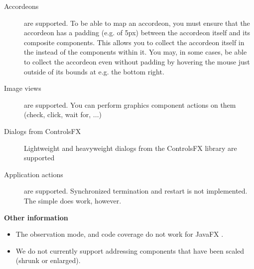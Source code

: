 \begin{description}
\item [Accordeons]{are supported. To be able to map an accordeon, you must ensure that the accordeon has a padding (e.g. of 5px) between the accordeon itself and its composite components. This allows you to collect the accordeon itself in the \gdomm{} instead of the components within it. You may, in some cases, be able to collect the accordeon even without padding by hovering the mouse just outside of its bounds at e.g. the bottom right.}
\item [Image views]{are supported. You can perform graphics component actions on them (check, click, wait for, ...)}
\item [Dialogs from ControlsFX]{Lightweight and heavyweight dialogs from the ControlsFX library are supported}
\item [Application actions]{are supported. Synchronized termination and restart is not implemented. The simple  does work, however.}
\end{description}

\textbf{Other information}
\begin{itemize}
\item The observation mode,  and code coverage do not work for JavaFX \gdauts{}. 
\item We do not currently support addressing components that have been scaled (shrunk or enlarged).
\end{itemize}
